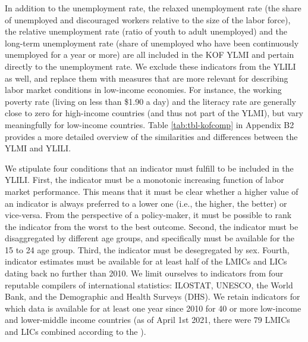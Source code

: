 \documentclass[
  a4paper, twoside, 12pt]{book}
\begin{document}
In addition to the unemployment rate, the relaxed unemployment rate (the share of unemployed and discouraged workers relative to the size of the labor force), the relative unemployment rate (ratio of youth to adult unemployed) and the long-term unemployment rate (share of unemployed who have been continuously unemployed for a year or more) are all included in the KOF YLMI and pertain directly to the unemployment rate. We exclude these indicators from the YLILI as well, and replace them with measures that are more relevant for describing labor market conditions in low-income economies. For instance, the working poverty rate (living on less than \$1.90 a day) and the literacy rate are generally close to zero for high-income countries (and thus not part of the YLMI), but vary meaningfully for low-income countries. Table \ref{tab:tbl-kofcomp} in Appendix B2 provides a more detailed overview of the similarities and differences between the YLMI and YLILI.

We stipulate four conditions that an indicator must fulfill to be included in the YLILI. First, the indicator must be a monotonic increasing function of labor market performance. This means that it must be clear whether a higher value of an indicator is always preferred to a lower one (i.e., the higher, the better) or vice-versa. From the perspective of a policy-maker, it must be possible to rank the indicator from the worst to the best outcome. Second, the indicator must be disaggregated by different age groups, and specifically must be available for the 15 to 24 age group. Third, the indicator must be desegregated by sex. Fourth, indicator estimates must be available for at least half of the LMICs and LICs dating back no further than 2010. We limit ourselves to indicators from four reputable compilers of international statistics: ILOSTAT, UNESCO, the World Bank, and the Demographic and Health Surveys (DHS). We retain indicators for which data is available for at least one year since 2010 for 40 or more low-income and lower-middle income countries (as of April 1st 2021, there were 79 LMICs and LICs combined according to the \textcite{worldbank2020a}).
\end{document}
